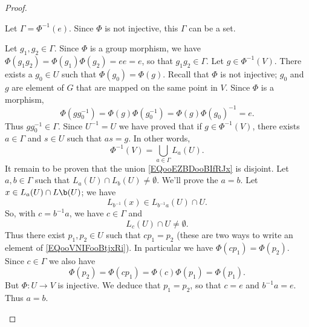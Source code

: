 \begin{proof}
\begin{subproof}
        Let \( \Gamma=\Phi^{-1}(e)\). Since \( \Phi\) is not injective, this \( \Gamma\) can be a set.
        \begin{subproof}
            Let \( g_1,g_2\in \Gamma\). Since \( \Phi\) is a group morphism, we have \( \Phi(g_1g_2)=\Phi(g_1)\Phi(g_2)=ee=e\), so that \( g_1g_2\in \Gamma\).
        \spitem[As an union]
            Let \( g\in\Phi^{-1}(V)\). There exists a \( g_0\in U\) such that \( \Phi(g_0)=\Phi(g)\). Recall that \( \Phi\) is not injective; \( g_0\) and \( g\) are element of \( G\) that are mapped on the same point in \( V\). Since \( \Phi\) is a morphism,
            \begin{equation}
                \Phi(gg_0^{-1})=\Phi(g)\Phi(g_0^{-1})=\Phi(g)\Phi(g_0)^{-1}=e.
            \end{equation}
            Thus \( gg_0^{-1}\in \Gamma\). Since \( U^{-1}=U\) we have proved that if \( g\in \Phi^{-1}(V)\), there exists \( a\in \Gamma\) and \( s\in U\) such that \( as=g\). In other words,
            \begin{equation}        \label{EQooEZBDooBIfRJx}
                \Phi^{-1}(V)=\bigcup_{a\in \Gamma}L_a(U).
            \end{equation}
        \spitem[Disjoint]
            It remain to be proven that the union \eqref{EQooEZBDooBIfRJx} is disjoint. Let \( a,b\in \Gamma\) such that \( L_a(U)\cap L_b(U)\neq \emptyset\). We'll prove the \( a=b\). Let \( x\in L_a(U)\cap L\b(U)\); we have
            \begin{equation}
                L_{b^{-1}}(x)\in L_{b^{-1} a}(U)\cap U.
            \end{equation}
            So, with \( c=b^{-1} a\), we have \( c\in\Gamma\) and
            \begin{equation}        \label{EQooVNIFooBtjxRi}
                L_c(U)\cap U\neq\emptyset.
            \end{equation}
            Thus there exist \( p_1,p_2\in U\) such that \( cp_1=p_2\) (these are two ways to write an element of \eqref{EQooVNIFooBtjxRi}). In particular we have \( \Phi(cp_1)=\Phi(p_2)\). Since \( c\in \Gamma\) we also have
            \begin{equation}
                \Phi(p_2)= \Phi(cp_1)=\Phi(c)\Phi(p_1)=\Phi(p_1).
            \end{equation}
            But \( \Phi\colon U\to V\) is injective. We deduce that \( p_1=p_2\), so that \( c=e\) and \( b^{-1}a=e\). Thus \( a=b\).
        \end{subproof}
    \end{subproof}
\end{proof}


